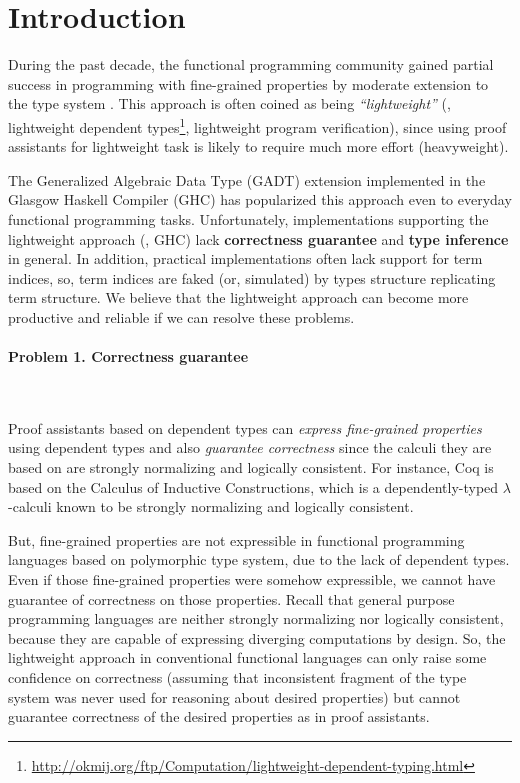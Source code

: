 \section{Introduction}
During the past decade, the functional programming community gained
partial success in programming with fine-grained properties
by moderate extension to the type system \cite{CheHin03,CheHin02,Xi03}.
This approach is often coined as being \emph{``lightweight''}
(\eg, lightweight dependent types\footnote{
  \url{http://okmij.org/ftp/Computation/lightweight-dependent-typing.html} },
  lightweight program verification),
since using proof assistants for lightweight task is likely to require
much more effort (heavyweight).

The Generalized Algebraic Data Type (GADT) extension implemented
in the Glasgow Haskell Compiler (GHC) has popularized this approach
even to everyday functional programming tasks.
%
Unfortunately, implementations supporting the lightweight approach (\eg, GHC)
lack \textbf{correctness guarantee} and \textbf{type inference} in general.
In addition, practical implementations often lack support for term indices,
so, term indices are faked (or, simulated) by types structure replicating
term structure. We believe that the lightweight approach can become
more productive and reliable if we can resolve these problems.

\paragraph{Problem 1. \textbf{Correctness guarantee}} ~

Proof assistants based on dependent types can
\emph{express fine-grained properties} using dependent types and
also \emph{guarantee correctness} since the calculi they are based on
are strongly normalizing and logically consistent. For instance, Coq is
based on the Calculus of Inductive Constructions, which is a dependently-typed
$\lambda$-calculi known to be strongly normalizing and logically consistent.
 
But, fine-grained properties are not expressible in functional programming
languages based on polymorphic type system, due to the lack of dependent types.
Even if those fine-grained properties were somehow expressible, we cannot have
guarantee of correctness on those properties. Recall that general purpose
programming languages are neither strongly normalizing nor logically consistent,
because they are capable of expressing diverging computations by design.
So, the lightweight approach in conventional functional languages can only
raise some confidence on correctness (assuming that inconsistent fragment of
the type system was never used for reasoning about desired properties) 
but cannot guarantee correctness of the desired properties as
in proof assistants.

